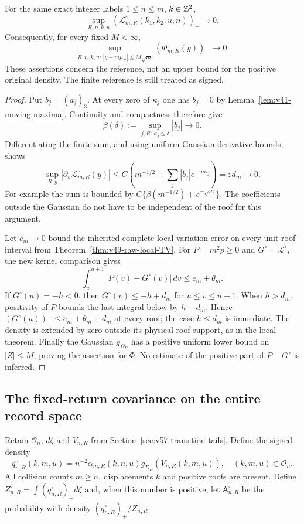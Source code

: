 \begin{proposition}
\label{prop:v58-reference-positivity}
For the same exact integer labels $1\le n\le m$, $k\in\mathbb Z^2$,
\begin{equation}\label{eq:v58-reference-negative}
 \sup_{R,n,k,u}(\mathcal L^\circ_{m,R}(k_1,k_2,u,n))_-\to0.
\end{equation}
Consequently, for every fixed $M<\infty$,
\[
 \sup_{R,n,k,u:\,|y-m\mu_R|\le M\sqrt m}
                  (\Phi_{m,R}(y))_-\to0.
\]
These assertions concern the reference, not an upper bound for the
positive original density. The finite reference is still treated as
signed.
\end{proposition}
\begin{proof}
Put $b_j=(a_j)_3$. At every zero of $\kappa_j$ one has $b_j=0$
by Lemma~\ref{lem:v41-moving-maxima}. Continuity and compactness
therefore give
\[
 \beta(\delta):=\sup_{j,R:\,\kappa_j\le\delta}|b_j|\to0.
\]
Differentiating the finite sum, and using uniform Gaussian derivative
bounds, shows
\begin{equation}\label{eq:v58-roof-lipschitz}
 \sup_{R,y}|\partial_u\mathcal L^\circ_{m,R}(y)|
 \le C\left(m^{-1/2}+\sum_j|b_j|e^{-m\kappa_j}\right)=:d_m\to0.
\end{equation}
For example the sum is bounded by $C\{\beta(m^{-1/2})+
 e^{-\sqrt m}\}$. The coefficients outside the Gaussian do not
have to be independent of the roof for this argument.

Let $e_m\to0$ bound the inherited complete local variation error on
every unit roof interval from Theorem~\ref{thm:v49-raw-local-TV}.
For $P=m^2p\ge0$ and $G^\circ=\mathcal L^\circ$, the new kernel
comparison gives
\[
 \int_u^{u+1}|P(v)-G^\circ(v)|\,dv\le e_m+\theta_m.
\]
If $G^\circ(u)=-h<0$, then
$G^\circ(v)\le-h+d_m$ for $u\le v\le u+1$.
When $h>d_m$, positivity of $P$ bounds the last integral below by
$h-d_m$. Hence $(G^\circ(u))_-\le e_m+\theta_m+d_m$ at every
roof; the case $h\le d_m$ is immediate. The density is extended by
zero outside its physical roof support, as in the local theorem.
Finally the Gaussian $g_{\Omega_R}$ has a positive uniform lower
bound on $|Z|\le M$, proving the assertion for $\Phi$.
No estimate of the positive part of $P-G^\circ$ is inferred.
\end{proof}

\subsection{The fixed-return covariance on the entire record space}
Retain $\mathcal O_n$, $d\zeta$ and $V_{n,R}$ from
Section~\ref{sec:v57-transition-tails}. Define the signed density
\begin{equation}\label{eq:v58-physical-reference}
 q^\circ_{n,R}(k,m,u)=n^{-2}\alpha_{m,R}(k,n,u)
                                  g_{D_R}(V_{n,R}(k,m,u)),
                  \quad(k,m,u)\in\mathcal O_n.
\end{equation}
All collision counts $m\ge n$, displacements $k$ and positive roofs
are present. Define $Z^\circ_{n,R}=\int(q^\circ_{n,R})_+d\zeta$ and,
when this number is positive, let $\mathsf A^\circ_{n,R}$ be the
probability with density $(q^\circ_{n,R})_+/Z^\circ_{n,R}$.

